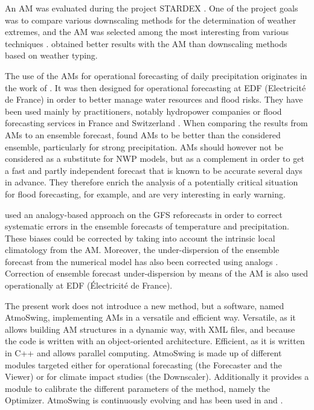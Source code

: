 \documentclass[review]{elsarticle}
\begin{document}
An AM was evaluated during the project STARDEX \citep[\textit{STAtistical and Regional dynamical Downscaling of EXtremes for European regions}, see][]{Goodess2003, Stardex2005}. One of the project goals was to compare various downscaling methods for the determination of weather extremes, and the AM was selected among the most interesting from various techniques \citep{Maheras2005, Schmidli2007}. \citet{Bliefernicht2010} obtained better results with the AM than downscaling methods based on weather typing.

The use of the AMs for operational forecasting of daily precipitation originates in the work of \citet{Duband1970, Duband1974, Duband1981}. It was then designed for operational forecasting at EDF (Electricit\'{e} de France) in order to better manage water resources and flood risks. They have been used mainly by practitioners, notably hydropower companies \citep{Desaint2008a, BenDaoud2009, Obled2014} or flood forecasting services in France and Switzerland \citep{Marty2010, GarciaHernandez2009b, Horton2012}. When comparing the results from AMs to an ensemble forecast, \citet{Marty2010} found AMs to be better than the considered ensemble, particularly for strong precipitation. AMs should however not be considered as a substitute for NWP models, but as a complement in order to get a fast and partly independent forecast that is known to be accurate several days in advance. They therefore enrich the analysis of a potentially critical situation for flood forecasting, for example, and are very interesting in early warning.

\citet{Hamill2006} used an analogy-based approach on the GFS reforecasts in order to correct systematic errors in the ensemble forecasts of temperature and precipitation. These biases could be corrected by taking into account the intrinsic local climatology from the AM. Moreover, the under-dispersion of the ensemble forecast from the numerical model has also been corrected using analogs \citep{Hamill2006}. Correction of ensemble forecast under-dispersion by means of the AM is also used operationally at EDF (\'{E}lectricit\'{e} de France).

The present work does not introduce a new method, but a software, named AtmoSwing, implementing AMs in a versatile and efficient way. Versatile, as it allows building AM structures in a dynamic way, with XML files, and because the code is written with an object-oriented architecture. Efficient, as it is written in C++ and allows parallel computing. AtmoSwing is made up of different modules targeted either for operational forecasting (the Forecaster and the Viewer) or for climate impact studies (the Downscaler). Additionally it provides a module to calibrate the different parameters of the method, namely the Optimizer. AtmoSwing is continuously evolving and has been used in \citet{Horton2012, Horton2017a, Horton2017b, Horton2018a} and \citet{Horton2018b}.
\end{document}
